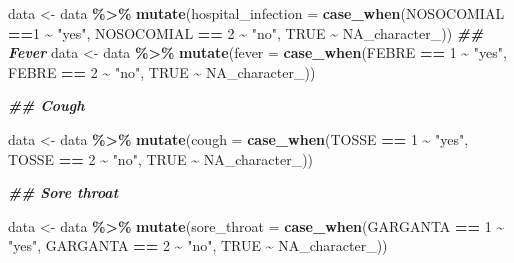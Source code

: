 \documentclass[
]{article}
\newenvironment{Shaded}{\begin{snugshade}}{\end{snugshade}}
\newcommand{\AttributeTok}[1]{\textcolor[rgb]{0.13,0.29,0.53}{#1}}
\newcommand{\ConstantTok}[1]{\textcolor[rgb]{0.56,0.35,0.01}{#1}}
\newcommand{\DecValTok}[1]{\textcolor[rgb]{0.00,0.00,0.81}{#1}}
\newcommand{\DocumentationTok}[1]{\textcolor[rgb]{0.56,0.35,0.01}{\textbf{\textit{#1}}}}
\newcommand{\FunctionTok}[1]{\textcolor[rgb]{0.13,0.29,0.53}{\textbf{#1}}}
\newcommand{\NormalTok}[1]{#1}
\newcommand{\OtherTok}[1]{\textcolor[rgb]{0.56,0.35,0.01}{#1}}
\newcommand{\SpecialCharTok}[1]{\textcolor[rgb]{0.81,0.36,0.00}{\textbf{#1}}}
\newcommand{\StringTok}[1]{\textcolor[rgb]{0.31,0.60,0.02}{#1}}
\begin{document}
\begin{Shaded}
\begin{Highlighting}[]
\NormalTok{data }\OtherTok{\textless{}{-}}\NormalTok{  data }\SpecialCharTok{\%\textgreater{}\%}
  \FunctionTok{mutate}\NormalTok{(}\AttributeTok{hospital\_infection =} \FunctionTok{case\_when}\NormalTok{(NOSOCOMIAL }\SpecialCharTok{==}\DecValTok{1}  \SpecialCharTok{\textasciitilde{}} \StringTok{"yes"}\NormalTok{,}
\NormalTok{                             NOSOCOMIAL }\SpecialCharTok{==} \DecValTok{2} \SpecialCharTok{\textasciitilde{}} \StringTok{"no"}\NormalTok{,}
                               \ConstantTok{TRUE} \SpecialCharTok{\textasciitilde{}} \ConstantTok{NA\_character\_}\NormalTok{))}
\DocumentationTok{\#\# Fever}
\NormalTok{data }\OtherTok{\textless{}{-}}\NormalTok{  data }\SpecialCharTok{\%\textgreater{}\%}
  \FunctionTok{mutate}\NormalTok{(}\AttributeTok{fever =} \FunctionTok{case\_when}\NormalTok{(FEBRE }\SpecialCharTok{==} \DecValTok{1} \SpecialCharTok{\textasciitilde{}} \StringTok{"yes"}\NormalTok{,}
\NormalTok{                              FEBRE }\SpecialCharTok{==} \DecValTok{2} \SpecialCharTok{\textasciitilde{}} \StringTok{"no"}\NormalTok{,}
                              \ConstantTok{TRUE} \SpecialCharTok{\textasciitilde{}} \ConstantTok{NA\_character\_}\NormalTok{))}

\DocumentationTok{\#\# Cough}

\NormalTok{data }\OtherTok{\textless{}{-}}\NormalTok{  data }\SpecialCharTok{\%\textgreater{}\%}
  \FunctionTok{mutate}\NormalTok{(}\AttributeTok{cough =} \FunctionTok{case\_when}\NormalTok{(TOSSE }\SpecialCharTok{==} \DecValTok{1} \SpecialCharTok{\textasciitilde{}} \StringTok{"yes"}\NormalTok{,}
\NormalTok{                              TOSSE }\SpecialCharTok{==} \DecValTok{2} \SpecialCharTok{\textasciitilde{}} \StringTok{"no"}\NormalTok{,}
                              \ConstantTok{TRUE} \SpecialCharTok{\textasciitilde{}} \ConstantTok{NA\_character\_}\NormalTok{))}

\DocumentationTok{\#\# Sore throat}

\NormalTok{data }\OtherTok{\textless{}{-}}\NormalTok{  data }\SpecialCharTok{\%\textgreater{}\%}
  \FunctionTok{mutate}\NormalTok{(}\AttributeTok{sore\_throat =} \FunctionTok{case\_when}\NormalTok{(GARGANTA }\SpecialCharTok{==} \DecValTok{1} \SpecialCharTok{\textasciitilde{}} \StringTok{"yes"}\NormalTok{,}
\NormalTok{                              GARGANTA  }\SpecialCharTok{==} \DecValTok{2} \SpecialCharTok{\textasciitilde{}} \StringTok{"no"}\NormalTok{,}
                              \ConstantTok{TRUE} \SpecialCharTok{\textasciitilde{}} \ConstantTok{NA\_character\_}\NormalTok{))}


\end{Highlighting}
\end{Shaded}
\end{document}
